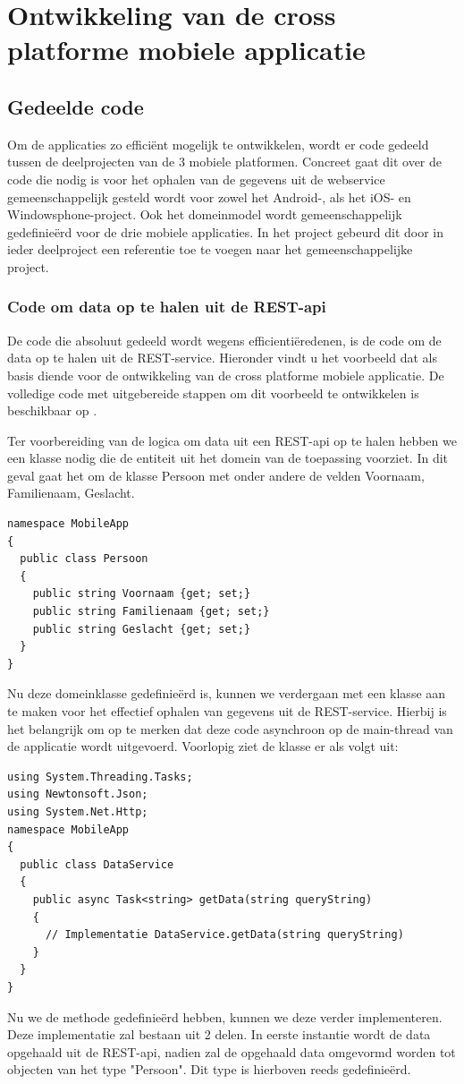 \section{Ontwikkeling van de cross platforme mobiele applicatie}
\subsection{Gedeelde code}
Om de applicaties zo efficiënt mogelijk te ontwikkelen, wordt er code gedeeld tussen de deelprojecten van de 3 mobiele
platformen. Concreet gaat dit over de code die nodig is voor het ophalen van de gegevens uit de webservice gemeenschappelijk
gesteld wordt voor zowel het Android-, als het iOS- en Windowsphone-project. Ook het domeinmodel wordt gemeenschappelijk
gedefinieërd voor de drie mobiele applicaties. In het project gebeurd dit door in ieder deelproject een referentie toe te voegen
naar het gemeenschappelijke project.

\subsubsection{Code om data op te halen uit de REST-api}
De code die absoluut gedeeld wordt wegens efficientiëredenen, is de code om de data op te halen uit de REST-service.
Hieronder vindt u het voorbeeld dat als basis diende voor de ontwikkeling van de cross platforme mobiele applicatie.
De volledige code met uitgebereide stappen om dit voorbeeld te ontwikkelen is beschikbaar op \citep{buildappwithnativeuiusingxamarininvisualstudio}.

Ter voorbereiding van de logica om data uit een REST-api op te halen hebben we een klasse nodig die de entiteit uit het
domein van de toepassing voorziet. In dit geval gaat het om de klasse Persoon met onder andere de velden Voornaam, Familienaam, Geslacht.
\newpage
\begin{lstlisting}
namespace MobileApp
{
  public class Persoon
  {
    public string Voornaam {get; set;}
    public string Familienaam {get; set;}
    public string Geslacht {get; set;}
  }
}
\end{lstlisting}
Nu deze domeinklasse gedefinieërd is, kunnen we verdergaan met een klasse aan te maken voor het effectief ophalen van
gegevens uit de REST-service. Hierbij is het belangrijk om op te merken dat deze code asynchroon op de main-thread van de
applicatie wordt uitgevoerd. Voorlopig ziet de klasse er als volgt uit:
\begin{lstlisting}
using System.Threading.Tasks;
using Newtonsoft.Json;
using System.Net.Http;
namespace MobileApp
{
  public class DataService
  {
    public async Task<string> getData(string queryString)
    {
      // Implementatie DataService.getData(string queryString)
    }
  }
}
\end{lstlisting}
Nu we de methode gedefinieërd hebben, kunnen we deze verder implementeren.
Deze implementatie zal bestaan uit 2 delen. In eerste instantie wordt de data opgehaald uit de REST-api, nadien zal de opgehaald data
omgevormd worden tot objecten van het type "Persoon". Dit type is hierboven reeds gedefinieërd.

